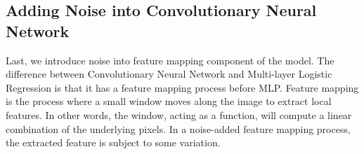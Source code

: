 \subsection{Adding Noise into Convolutionary Neural Network}
Last, we introduce noise into feature mapping component of
the model. The difference between Convolutionary Neural Network and
Multi-layer Logistic Regression is that it has a feature mapping process
before MLP. Feature mapping is the process where a small window moves along
the image to extract local features. In other words, the window, acting as
a function, will compute a linear combination of the underlying pixels.
In a noise-added feature mapping process, the extracted feature is subject
to some variation.

